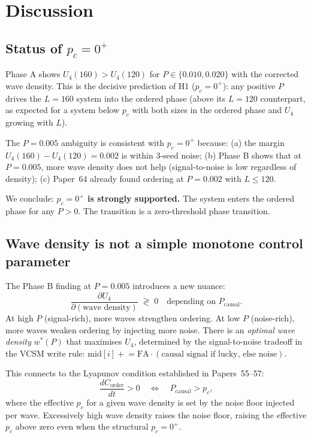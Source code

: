 \documentclass[11pt,a4paper]{article}
\begin{document}
\section{Discussion}

\subsection{Status of $p_c=0^+$}

Phase A shows $U_4(160)>U_4(120)$ for $P\in\{0.010,0.020\}$ with the
corrected wave density.  This is the decisive prediction of H1 ($p_c=0^+$):
any positive $P$ drives the $L=160$ system into the ordered phase (above
its $L=120$ counterpart, as expected for a system below $p_c$ with both
sizes in the ordered phase and $U_4$ growing with $L$).

The $P=0.005$ ambiguity is consistent with $p_c=0^+$ because:
(a) the margin $U_4(160)-U_4(120)=0.002$ is within 3-seed noise;
(b) Phase B shows that at $P=0.005$, more wave density does not help
(signal-to-noise is low regardless of density);
(c) Paper~64 already found ordering at $P=0.002$ with $L\le120$.

We conclude: \textbf{$p_c = 0^+$ is strongly supported.}
The system enters the ordered phase for any $P>0$.
The transition is a zero-threshold phase transition.

\subsection{Wave density is not a simple monotone control parameter}

The Phase B finding at $P=0.005$ introduces a new nuance:
\begin{equation}
  \frac{\partial U_4}{\partial (\text{wave density})} \;\gtrless\; 0
  \quad\text{depending on }P_\text{causal}.
\end{equation}
At high $P$ (signal-rich), more waves strengthen ordering.
At low $P$ (noise-rich), more waves weaken ordering by injecting more noise.
There is an \emph{optimal wave density} $w^*(P)$ that maximises $U_4$,
determined by the signal-to-noise tradeoff in the VCSM write rule:
$\text{mid}[i] \mathrel{+}= \text{FA}\cdot(\text{causal signal if lucky, else noise})$.

This connects to the Lyapunov condition established in Papers~55--57:
\begin{equation}
  \frac{dC_\text{order}}{dt} > 0 \quad\Longleftrightarrow\quad P_\text{causal} > p_c,
\end{equation}
where the effective $p_c$ for a given wave density is set by the noise floor
injected per wave.  Excessively high wave density raises the noise floor,
raising the effective $p_c$ above zero even when the structural $p_c=0^+$.
\end{document}
